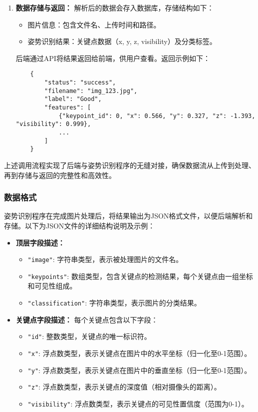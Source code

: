 \begin{enumerate}
    \item \textbf{数据存储与返回：}
    解析后的数据会存入数据库，存储结构如下：
    \begin{itemize}
        \item 图片信息：包含文件名、上传时间和路径。
        \item 姿势识别结果：关键点数据（x, y, z, visibility）及分类标签。
    \end{itemize}
    后端通过API将结果返回给前端，供用户查看。返回示例如下：
    \begin{lstlisting}
    {
        "status": "success",
        "filename": "img_123.jpg",
        "label": "Good",
        "features": [
            {"keypoint_id": 0, "x": 0.566, "y": 0.327, "z": -1.393, "visibility": 0.999},
            ...
        ]
    }
    \end{lstlisting}

\end{enumerate}

上述调用流程实现了后端与姿势识别程序的无缝对接，确保数据流从上传到处理、再到存储与返回的完整性和高效性。


\subsubsection{数据格式}

姿势识别程序在完成图片处理后，将结果输出为JSON格式文件，以便后端解析和存储。以下为JSON文件的详细结构说明及示例：

\begin{itemize}
    \item \textbf{顶层字段描述：}
    \begin{itemize}
        \item \texttt{"image"}: 字符串类型，表示被处理图片的文件名。
        \item \texttt{"keypoints"}: 数组类型，包含关键点的检测结果，每个关键点由一组坐标和可见性组成。
        \item \texttt{"classification"}: 字符串类型，表示图片的分类结果。
    \end{itemize}

    \item \textbf{关键点字段描述：}
    每个关键点包含以下字段：
    \begin{itemize}
        \item \texttt{"id"}: 整数类型，关键点的唯一标识符。
        \item \texttt{"x"}: 浮点数类型，表示关键点在图片中的水平坐标（归一化至0-1范围）。
        \item \texttt{"y"}: 浮点数类型，表示关键点在图片中的垂直坐标（归一化至0-1范围）。
        \item \texttt{"z"}: 浮点数类型，表示关键点的深度值（相对摄像头的距离）。
        \item \texttt{"visibility"}: 浮点数类型，表示关键点的可见性置信度（范围为0-1）。
    \end{itemize}
\end{itemize}

